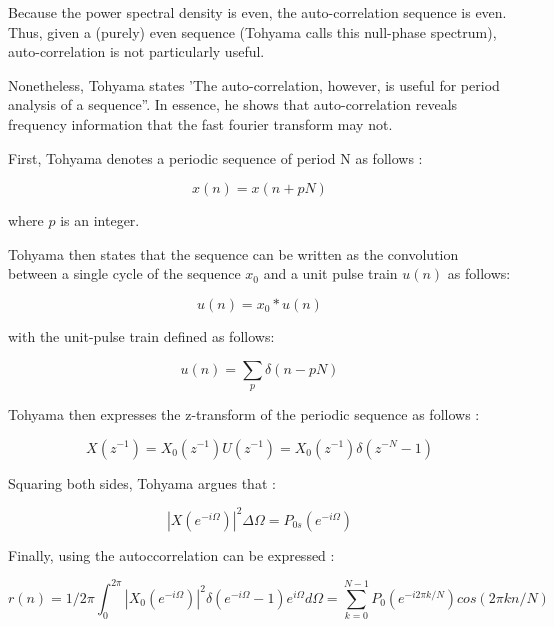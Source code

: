 \documentclass[12pt]{article}
\begin{document}
Because the power spectral density is even, the auto-correlation sequence is even. Thus, given a (purely) even sequence (Tohyama calls this null-phase spectrum), auto-correlation is not particularly useful\citep{aa}.\newline

Nonetheless, Tohyama states 'The auto-correlation, however, is useful for period analysis of a sequence''\citep{aa}. In essence, he shows that auto-correlation reveals frequency information that the fast fourier transform may not.\newline

First, Tohyama denotes a periodic sequence of period N as follows \citep{aa}:

\begin{equation}
x(n) = x(n + pN)\label{periodic sequence}
\end{equation}

where $p$ is an integer.

Tohyama then states that the sequence can be written as the convolution between a single cycle of the sequence $x_0$ and a unit pulse train $u(n)$ as follows:

\begin{equation}
u(n) = x_0 * u(n)
\label{single cycle train}
\end{equation}

with the unit-pulse train defined as follows\citep{aa}:

\begin{equation}
u(n) = \sum\limits_{p} \delta (n-pN)
\label{unit pulse}
\end{equation}

Tohyama then expresses the z-transform of the periodic sequence as follows \cite{aa}:

\begin{equation}
X(z^{-1}) = X_0(z^{-1})U(z^{-1}) = X_0(z^{-1})\delta(z^{-N}-1)\label{auto 1}
\end{equation}

Squaring both sides, Tohyama argues that \cite{aa}:

\begin{equation}
|X(e^{-i\Omega})|^{2}\Delta\Omega = P_{0s}(e^{-i\Omega})\label{auto 2}
\end{equation}

Finally, using \label{autocorrelation power spectrum} the autoccorrelation can be expressed \cite{aa}:



\begin{equation}
r(n) = {1/{2\pi}}\int_{0}^{2\pi}|X_0(e^{-i\Omega})|^2\delta(e^{-i\Omega}-1)e^{i\Omega}d\Omega = \sum_{k=0}^{N-1}P_0(e^{-i2{\pi}k/N})cos({2{\pi}kn/N})\label{auto 3}
\end{equation}
\end{document}
